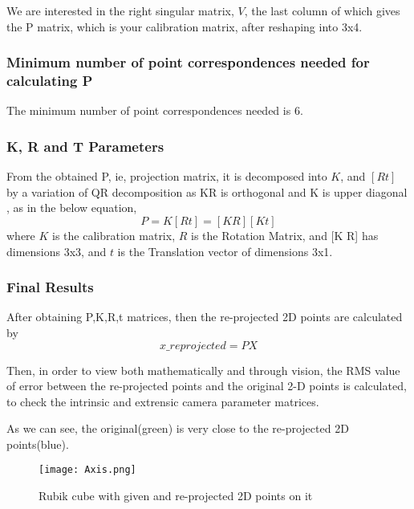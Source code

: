 \documentclass{article}[11pt]
\begin{document}
We are interested in the right singular matrix, $V$, the last column of which gives the P matrix, which is your calibration matrix, after reshaping into 3x4.

\subsubsection{Minimum number of point correspondences needed for calculating P }

The minimum number of point correspondences needed is 6.


\subsubsection{K, R and T Parameters}

From the obtained P, ie, projection matrix, it is decomposed into $K$, and $[R t]$ by a variation of QR decomposition as KR is orthogonal and K is upper diagonal , as in the below equation,
\begin{equation}
    P = K[R t] = [K R][K t] 
\end{equation}
where $K$ is the calibration matrix, $R$ is the Rotation Matrix, and [K R] has dimensions 3x3, and $t$ is the Translation vector of dimensions 3x1. 

\subsubsection{Final Results}

After obtaining P,K,R,t matrices, then the re-projected 2D points are calculated by
\begin{equation}
    x\_reprojected = PX
\end{equation}

Then, in order to view both mathematically and through vision, the RMS value of error between the re-projected points and the original 2-D points is calculated, to check the intrinsic and extrensic camera parameter matrices.

As we can see, the original(green) is very close to the re-projected 2D points(blue).

\begin{figure}[h]
\centering
    \texttt{[image: Axis.png]}
\caption{Rubik cube with given and re-projected 2D points on it}
\label{fig:cube}
\end{figure}
\end{document}
